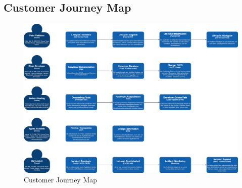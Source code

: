 \documentclass[a4paper,12pt]{article}
\begin{document}
    \subsection{Customer Journey Map}
    \label{subsec:cusjourmap}
    \begin{figure}
        \includegraphics[angle=270,origin=c,width=\linewidth]{customer-journey.png}
        \caption{Customer Journey Map}
        \label{fig:customerjourney}
    \end{figure}
\end{document}
